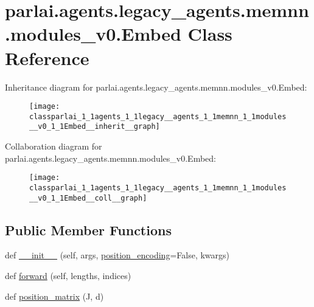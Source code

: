 \hypertarget{classparlai_1_1agents_1_1legacy__agents_1_1memnn_1_1modules__v0_1_1Embed}{}\section{parlai.\+agents.\+legacy\+\_\+agents.\+memnn.\+modules\+\_\+v0.\+Embed Class Reference}
\label{classparlai_1_1agents_1_1legacy__agents_1_1memnn_1_1modules__v0_1_1Embed}


Inheritance diagram for parlai.\+agents.\+legacy\+\_\+agents.\+memnn.\+modules\+\_\+v0.\+Embed\+:
\nopagebreak
\begin{figure}[H]
\begin{center}
\leavevmode
\texttt{[image: classparlai\_1\_1agents\_1\_1legacy\_\_agents\_1\_1memnn\_1\_1modules\_\_v0\_1\_1Embed\_\_inherit\_\_graph]}
\end{center}
\end{figure}


Collaboration diagram for parlai.\+agents.\+legacy\+\_\+agents.\+memnn.\+modules\+\_\+v0.\+Embed\+:
\nopagebreak
\begin{figure}[H]
\begin{center}
\leavevmode
\texttt{[image: classparlai\_1\_1agents\_1\_1legacy\_\_agents\_1\_1memnn\_1\_1modules\_\_v0\_1\_1Embed\_\_coll\_\_graph]}
\end{center}
\end{figure}
\subsection*{Public Member Functions}
\begin{DoxyCompactItemize}
\item 
def \hyperlink{classparlai_1_1agents_1_1legacy__agents_1_1memnn_1_1modules__v0_1_1Embed_aee1b369b4a7f6b23788e30e2dc3e439f}{\+\_\+\+\_\+init\+\_\+\+\_\+} (self, args, \hyperlink{classparlai_1_1agents_1_1legacy__agents_1_1memnn_1_1modules__v0_1_1Embed_ac0a34fe405b50e9d36e366d7b3b3913f}{position\+\_\+encoding}=False, kwargs)
\item 
def \hyperlink{classparlai_1_1agents_1_1legacy__agents_1_1memnn_1_1modules__v0_1_1Embed_a4496856f88b3a68d1928ea500041c7c3}{forward} (self, lengths, indices)
\item 
def \hyperlink{classparlai_1_1agents_1_1legacy__agents_1_1memnn_1_1modules__v0_1_1Embed_aac0da7cbc9d64949060c6c681172220f}{position\+\_\+matrix} (J, d)
\end{DoxyCompactItemize}
